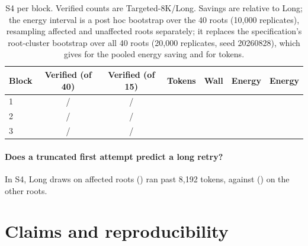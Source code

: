 \begin{table}[h]
\caption{S4 per block.  Verified counts are Targeted-8K/Long.  Savings are relative to Long; the energy interval is a post hoc bootstrap over the 40 roots (10{,}000 replicates), resampling affected and unaffected roots separately; it replaces the specification's root-cluster bootstrap over all 40 roots (20{,}000 replicates, seed 20260828), which gives \CrCapEnergyPrespecCI{} for the pooled energy saving and \CrCapTokensPrespecCI{} for tokens.}
\label{tab:cap-perblock}
\centering\small
\begin{tabular}{lccrrrr}
\toprule
Block & Verified (of 40) & Verified (of 15) & Tokens & Wall & Energy & Energy \ci{} \\
\midrule
1 & \CapBlockOneAllFortyTargeted{}/\CapBlockOneAllFortyLong{} & \CapBlockOneAffectedFifteenTargeted{}/\CapBlockOneAffectedFifteenLong{} & \CapBlockOneTokensSavedPct{} & \CapBlockOneWallSavedPct{} & \CapBlockOneJoulesSavedPct{} & \CrCapEnergyBOneCI{} \\
2 & \CapBlockTwoAllFortyTargeted{}/\CapBlockTwoAllFortyLong{} & \CapBlockTwoAffectedFifteenTargeted{}/\CapBlockTwoAffectedFifteenLong{} & \CapBlockTwoTokensSavedPct{} & \CapBlockTwoWallSavedPct{} & \CapBlockTwoJoulesSavedPct{} & \CrCapEnergyBTwoCI{} \\
3 & \CapBlockThreeAllFortyTargeted{}/\CapBlockThreeAllFortyLong{} & \CapBlockThreeAffectedFifteenTargeted{}/\CapBlockThreeAffectedFifteenLong{} & \CapBlockThreeTokensSavedPct{} & \CapBlockThreeWallSavedPct{} & \CapBlockThreeJoulesSavedPct{} & \CrCapEnergyBThreeCI{} \\
\bottomrule
\end{tabular}
\end{table}

\paragraph{Does a truncated first attempt predict a long retry?}
In S4, \CrAffOverCap{} Long draws on affected roots (\CrAffOverCapPct{}) ran past 8,192 tokens, against \CrUnaffOverCap{} (\CrUnaffOverCapPct{}) on the other roots.

\FloatBarrier
\section{Claims and reproducibility}
\label{app:claims}


